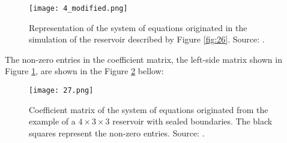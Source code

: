 \begin{figure}[H]
	\centering
	\texttt{[image: 4\_modified.png]}\\
	\caption{Representation of the system of equations originated in the simulation of the reservoir described by Figure \ref{fig:26}. Source: \cite{Ertekin2001}.}
	\label{fig:04}
\end{figure}
\noindent
 The non-zero entries in the coefficient matrix, the left-side matrix shown in Figure \ref{fig:04}, are shown in the Figure \ref{fig:27} bellow:
\begin{figure}[H]
	\centering
	\texttt{[image: 27.png]}\\
	\caption{Coefficient matrix of the system of equations originated from the \cite{Ertekin2001} example of a $ 4 \times 3 \times 3 $  reservoir with sealed boundaries. The black squares represent the non-zero entries. Source: \cite{Ertekin2001}.}
	\label{fig:27}
\end{figure}